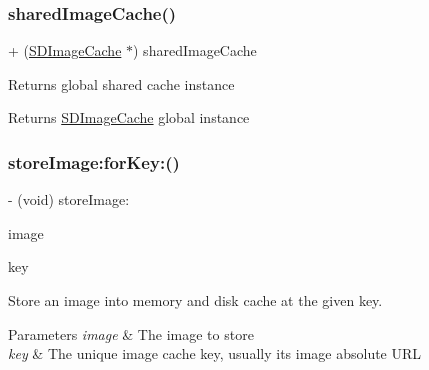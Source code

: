 \subsubsection{\texorpdfstring{shared\+Image\+Cache()}{sharedImageCache()}\hspace{0.1cm}{\footnotesize\ttfamily [3/3]}}
{\footnotesize\ttfamily + (\mbox{\hyperlink{interface_s_d_image_cache}{S\+D\+Image\+Cache}} $\ast$) shared\+Image\+Cache \begin{DoxyParamCaption}{ }\end{DoxyParamCaption}}

Returns global shared cache instance

\begin{DoxyReturn}{Returns}
\mbox{\hyperlink{interface_s_d_image_cache}{S\+D\+Image\+Cache}} global instance 
\end{DoxyReturn}
\mbox{\label{interface_s_d_image_cache_a28d995cab90e214dc5603403a7ed7753}} 
\subsubsection{\texorpdfstring{store\+Image\+:for\+Key\+:()}{storeImage:forKey:()}\hspace{0.1cm}{\footnotesize\ttfamily [1/3]}}
{\footnotesize\ttfamily -\/ (void) store\+Image\+: \begin{DoxyParamCaption}\item[{(U\+I\+Image $\ast$)}]{image }\item[{forKey:(N\+S\+String $\ast$)}]{key }\end{DoxyParamCaption}}

Store an image into memory and disk cache at the given key.


\begin{DoxyParams}{Parameters}
{\em image} & The image to store \\
\hline
{\em key} & The unique image cache key, usually it\textquotesingle{}s image absolute U\+RL \\
\hline
\end{DoxyParams}
\mbox{\label{interface_s_d_image_cache_a28d995cab90e214dc5603403a7ed7753}} 
